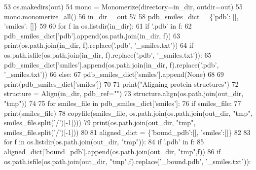 \begin{DoxyCode}
53             os.makedirs(out)
54         mono = Monomerize(directory=in\_dir, outdir=out)
55         mono.monomerize\_all()
56         in\_dir = out
57 
58     pdb\_smiles\_dict = \{\textcolor{stringliteral}{'pdb'}: [], \textcolor{stringliteral}{'smiles'}: []\}
59 
60     \textcolor{keywordflow}{for} f \textcolor{keywordflow}{in} os.listdir(in\_dir):
61         \textcolor{keywordflow}{if} \textcolor{stringliteral}{'.pdb'} \textcolor{keywordflow}{in} f:
62             pdb\_smiles\_dict[\textcolor{stringliteral}{'pdb'}].append(os.path.join(in\_dir, f))
63             print(os.path.join(in\_dir, f).replace(\textcolor{stringliteral}{'.pdb'}, \textcolor{stringliteral}{'\_smiles.txt'}))
64             \textcolor{keywordflow}{if} os.path.isfile(os.path.join(in\_dir, f).replace(\textcolor{stringliteral}{'.pdb'}, \textcolor{stringliteral}{'\_smiles.txt'})):
65                 pdb\_smiles\_dict[\textcolor{stringliteral}{'smiles'}].append(os.path.join(in\_dir, f).replace(\textcolor{stringliteral}{'.pdb'}, \textcolor{stringliteral}{'\_smiles.txt'}))
66             \textcolor{keywordflow}{else}:
67                 pdb\_smiles\_dict[\textcolor{stringliteral}{'smiles'}].append(\textcolor{keywordtype}{None})
68 
69     print(pdb\_smiles\_dict[\textcolor{stringliteral}{'smiles'}])
70 
71     print(\textcolor{stringliteral}{"Aligning protein structures"})
72     structure = Align(in\_dir, pdb\_ref=\textcolor{stringliteral}{""})
73     structure.align(os.path.join(out\_dir, \textcolor{stringliteral}{"tmp"}))
74 
75     \textcolor{keywordflow}{for} smiles\_file \textcolor{keywordflow}{in} pdb\_smiles\_dict[\textcolor{stringliteral}{'smiles'}]:
76         \textcolor{keywordflow}{if} smiles\_file:
77             print(smiles\_file)
78             copyfile(smiles\_file, os.path.join(os.path.join(out\_dir, \textcolor{stringliteral}{"tmp"}, smiles\_file.split(\textcolor{stringliteral}{'/'})[-1])))
79             print(os.path.join(out\_dir, \textcolor{stringliteral}{"tmp"}, smiles\_file.split(\textcolor{stringliteral}{'/'})[-1]))
80 
81     aligned\_dict = \{\textcolor{stringliteral}{'bound\_pdb'}:[], \textcolor{stringliteral}{'smiles'}:[]\}
82 
83     \textcolor{keywordflow}{for} f \textcolor{keywordflow}{in} os.listdir(os.path.join(out\_dir, \textcolor{stringliteral}{"tmp"})):
84         \textcolor{keywordflow}{if} \textcolor{stringliteral}{'.pdb'} \textcolor{keywordflow}{in} f:
85             aligned\_dict[\textcolor{stringliteral}{'bound\_pdb'}].append(os.path.join(out\_dir, \textcolor{stringliteral}{"tmp"},f))
86             \textcolor{keywordflow}{if} os.path.isfile(os.path.join(out\_dir, \textcolor{stringliteral}{"tmp"},f).replace(\textcolor{stringliteral}{'\_bound.pdb'}, \textcolor{stringliteral}{'\_smiles.txt'})):

\end{DoxyCode}
